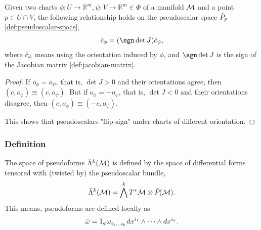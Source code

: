 \documentclass[../main.tex]{subfiles}
\begin{document}
    \begin{theorem}\label{thm:pseudoscalar-coordinate-transformation}
        Given two charts \(\phi : U \to \mathbb{R}^m, \psi : V \to \mathbb{R}^m \in 
        \Phi\) of a manifold \(\manifold[M]\) and a point \(p \in U \cap V\), the 
        following relationship holds on the pseudoscalar space \(\pseudoscalar[p]\)
        \cref{def:pseudoscalar-space},
        \[
        \pseudo{c}_\phi=(\sgn \det J)\pseudo{c}_\psi,
        \]
        where \(\pseudo{c}_\phi\) means using the orientation induced by \(\phi\), 
        and \(\sgn \det J\) is the sign of the Jacobian matrix 
        \cref{def:jacobian-matrix}.
    \end{theorem}
    \begin{proof}
        If \(o_\phi = o_\psi\), that is, \(\det J > 0\) and their orientations agree, 
        then \((c, o_\phi)\equiv(c, o_\psi)\).
        But if \(o_\phi = -o_\psi\), that is, \(\det J < 0\) and their orientations 
        disagree, then \((c, o_\phi)\equiv(-c, o_\psi)\).\par
        This shows that pseudoscalars "flip sign" under charts of different orientation.
    \end{proof}
    \newpage
    \subsubsection{Definition}
    \begin{definition}[Pseudoforms]\label{def:pseudoforms}
        The space of pseudoforms \(\pseudoform{k}{M}\) is defined by the space of 
        differential forms tensored with (twisted by) the pseudoscalar bundle,
        \[
        \pseudoform{k}{M} = \bigwedge^kT^*\manifold[M] \otimes 
        \pseudoscalar(\manifold[M]).
        \]
        This means, pseudoforms are defined locally as 
        \[
        \pseudo{\omega} = \pseudo{1}_\phi\omega\indices{_{i_1}_{\dots}_{i_k}}
        dx^{i_1}\wedge\dots\wedge dx^{i_k}.
        \]
    \end{definition}
\end{document}
